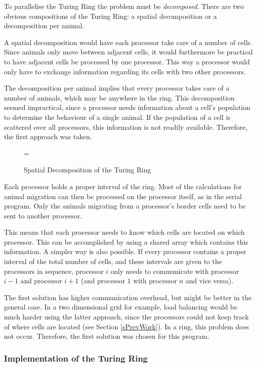To parallelise the Turing Ring the problem must be {\em decomposed}.
There are two obvious compositions of the Turing Ring: a spatial
decomposition or a decomposition per animal.

A spatial decomposition would have each processor take care
of a number of cells. Since animals only move between adjacent cells, it
would furthermore be practical to have adjacent cells be processed by
one processor. This way a processor would only have to exchange information
regarding its cells with two other processors.

The decomposition per animal implies that every processor takes care of
a number of animals, which may be anywhere in the ring. This
decomposition seemed impractical, since a processor needs
information about a cell's population to determine the behaviour of a
single animal. If the population of a cell is scattered over all 
processors, this information is not readily available.
Therefore, the first approach was taken.

\begin{figure}
\epsfxsize=\textwidth
{}
\caption{Spatial Decomposition of the Turing Ring}
\label{fSpatialDecomposition}
\end{figure}

Each processor holds a proper
interval of the ring. Most of the calculations for animal migration can
then be
processed on the processor itself, as in the serial program. Only the
animals migrating from a processor's border cells need to be sent to
another processor.

This means that each processor needs to know which
cells are located on which processor. This can be accomplished by using
a shared array which contains this information. A simpler way is also
possible. If every processor contains a proper interval of the total
number of cells, and these intervals are given to the processors in
sequence, processor $i$ only needs to communicate with processor
$i - 1$ and processor $i + 1$ (and processor $1$ with processor $n$ and
vice versa).

The first solution has higher communication overhead,
but might be better in the general
case. In a two dimensional grid for example, load balancing would be much
harder using the latter approach, since the processors could not keep track
of where cells are located (see Section \ref{sPrevWork}).
In a ring, this problem does not occur. Therefore, the first solution was
chosen for this program.

\subsubsection{Implementation of the Turing Ring}

